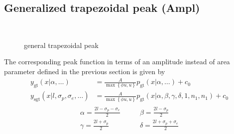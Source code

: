 \subsection{Generalized trapezoidal peak (Ampl)} ~\\

\begin{figure}[htb]
\captionsetup[subfigure]{position=b}
\centering
{}
\hfill
{}
\caption{general trapezoidal peak}
\end{figure}

\label{sec:generalizedtrapezoidalAmpl}
The corresponding peak function in terms of an amplitude instead of area parameter defined in the previous section is given by
\begin{align}\label{eq:generalizedtrapezoidalpeakAmpl}
y_\mathrm{gt}(x|\alpha,\ldots) &= \frac{A}{\max\left\{\phi u,u\right\}}\textstyle p_\mathrm{gt}(x|\alpha,\ldots) +c_0 \\
y_\mathrm{sgt}(x|l,\sigma_p,\sigma_e,\ldots) &= \frac{A}{\max\left\{\phi u,u\right\}} \textstyle p_\mathrm{gt}\left(x|\alpha,\beta,\gamma,\delta,1,n_1,n_1\right) +c_0 
\end{align}
\begin{align}
\begin{array}{ll} 
\displaystyle\alpha = \frac{2l-\sigma_p-\sigma_e}{2} & \displaystyle\qquad \beta  = \frac{2l-\sigma_p}{2} \\
\displaystyle\gamma = \frac{2l+\sigma_p}{2}          & \displaystyle\qquad \delta = \frac{2l+\sigma_p+\sigma_e}{2}
\end{array}
\end{align}

